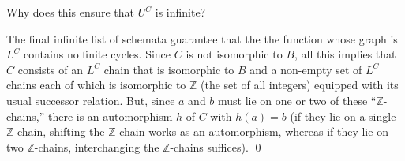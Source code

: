 \begin{aside}
    Why does this ensure that $U^C$ is infinite?
\end{aside}

The final infinite list of schemata guarantee that the the function whose graph is $L^C$ contains no finite cycles. Since $C$ is not isomorphic to $B$, all this implies that $C$ consists of an $L^C$ chain that is isomorphic to $B$ and a non-empty set of $L^C$ chains each of which is isomorphic to $\mathbb{Z}$ (the set of all integers) equipped with its usual successor relation. But, since $a$ and $b$ must lie on one or two of these ``$\mathbb{Z}$-chains,'' there is an automorphism $h$ of $C$ with $h(a)=b$ (if they lie on a single $\mathbb{Z}$-chain, shifting the $\mathbb{Z}$-chain works as an automorphism, whereas if they lie on two $\mathbb{Z}$-chains, interchanging the $\mathbb{Z}$-chains suffices). \qed